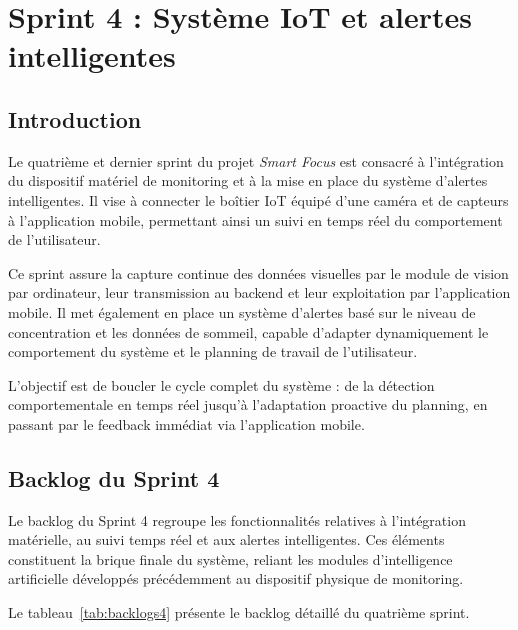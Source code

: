 
\chapter{Sprint 4 : Système IoT et alertes intelligentes}
\label{chap:sprint4}

\section{Introduction}

Le quatrième et dernier sprint du projet \textit{Smart Focus} est consacré à l'intégration du dispositif matériel de monitoring et à la mise en place du système d'alertes intelligentes. Il vise à connecter le boîtier IoT équipé d'une caméra et de capteurs à l'application mobile, permettant ainsi un suivi en temps réel du comportement de l'utilisateur.

Ce sprint assure la capture continue des données visuelles par le module de vision par ordinateur, leur transmission au backend et leur exploitation par l'application mobile. Il met également en place un système d'alertes basé sur le niveau de concentration et les données de sommeil, capable d'adapter dynamiquement le comportement du système et le planning de travail de l'utilisateur.

L'objectif est de boucler le cycle complet du système : de la détection comportementale en temps réel jusqu'à l'adaptation proactive du planning, en passant par le feedback immédiat via l'application mobile.

\section{Backlog du Sprint 4}

Le backlog du Sprint 4 regroupe les fonctionnalités relatives à l'intégration matérielle, au suivi temps réel et aux alertes intelligentes. Ces éléments constituent la brique finale du système, reliant les modules d'intelligence artificielle développés précédemment au dispositif physique de monitoring.

Le tableau~\ref{tab:backlogs4} présente le backlog détaillé du quatrième sprint.

